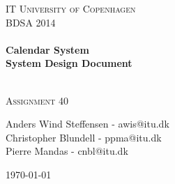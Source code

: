 


%


\begin{center}
\thispagestyle{empty}


\textsc{\LARGE IT University of Copenhagen}\\[1.5cm]

\textsc{\Large BDSA 2014 }\\[0.5cm]

\HRule \\[0.4cm]
{ \huge \bfseries Calendar System \\ System Design Document\\ [0.4cm]
    }

\HRule \\[1cm]

\textsc{\Large Assignment 40 }\\[1.5cm]

\begin{minipage}{1\textwidth}
\begin{center} \large
Anders Wind Steffensen - awis@itu.dk\\
Christopher Blundell - ppma@itu.dk\\
Pierre Mandas - cnbl@itu.dk\\
\end{center}
\end{minipage}


\vfill

{\large \today}

\end{center}

\frontmatter%

%
%


\tableofcontents
\newpage

\mainmatter%









